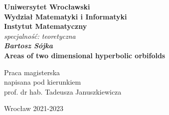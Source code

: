 \newpage
\thispagestyle{empty}
\begin{center}
\textbf{\large Uniwersytet Wrocławski\\
Wydział Matematyki i Informatyki\\
Instytut Matematyczny}\\
\textit{\large specjalność: teoretyczna}\\
\vspace{4cm}
\textbf{\textit{\large Bartosz Sójka}\\
\vspace{0.5cm}
{\Large Areas of two dimensional hyperbolic orbifolds}}\\
\end{center}
\vspace{3cm}
{\large \hspace*{6.5cm}Praca magisterska\\
\hspace*{6.5cm}napisana pod kierunkiem\\
\hspace*{6.5cm}prof. dr hab. Tadeusza Januszkiewicza }\\
\vfill
\begin{center}
{\large Wrocław 2021-2023}\\
\end{center}
